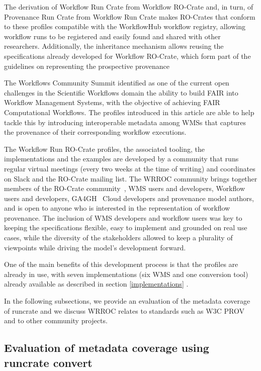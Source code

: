 \documentclass[10pt,letterpaper]{article}
\begin{document}
The derivation of Workflow Run Crate from Workflow RO-Crate and, in turn, of Provenance Run Crate from Workflow Run Crate makes RO-Crates that conform to these profiles compatible with the WorkflowHub workflow registry, allowing workflow runs to be registered and easily found and shared with other researchers. Additionally, the inheritance mechanism allows reusing the specifications already developed for Workflow RO-Crate, which form part of the guidelines on representing the prospective provenance

The Workflows Community Summit \cite{Ferreira 2022} identified as one of the current open challenges in the Scientific Workflows domain the ability to build FAIR into Workflow Management Systems, with the objective of achieving FAIR Computational Workflows. The profiles introduced in this article are able to help tackle this by introducing interoperable metadata among WMSs that captures the provenance of their corresponding workflow executions.

The Workflow Run RO-Crate profiles, the associated tooling, the implementations and the examples are developed by a community that runs regular virtual meetings (every two weeks at the time of writing) and coordinates on Slack and the RO-Crate mailing list.
The WRROC community brings together members of the RO-Crate community~\cite{Soiland-Reyes 2022a}, WMS users and developers, Workflow users and developers, GA4GH~\cite{Rehm 2021} Cloud developers and provenance model authors, and is open to anyone who is interested in the representation of workflow provenance.
The inclusion of WMS developers and workflow users was key to keeping the specifications flexible, easy to implement and grounded on real use cases, while the diversity of the stakeholders allowed to keep a plurality of viewpoints while driving the model's development forward.

One of the main benefits of this development process is that the profiles are already in use, with seven implementations (six WMS and one conversion tool) already available as described in section \ref{implementations} .

In the following subsections, we provide an evaluation of the metadata coverage of runcrate and we discuss WRROC relates to standards such as W3C PROV and to other community projects.


\subsection{Evaluation of metadata coverage using runcrate convert}
\end{document}
